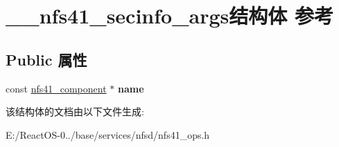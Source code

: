 \hypertarget{struct____nfs41__secinfo__args}{}\section{\+\_\+\+\_\+nfs41\+\_\+secinfo\+\_\+args结构体 参考}
\label{struct____nfs41__secinfo__args}
\subsection*{Public 属性}
\begin{DoxyCompactItemize}
\item 
\mbox{\label{struct____nfs41__secinfo__args_a1fec7e436fb04d07c8ab312b0f1d7e96}} 
const \hyperlink{struct____nfs41__component}{nfs41\+\_\+component} $\ast$ {\bfseries name}
\end{DoxyCompactItemize}


该结构体的文档由以下文件生成\+:\begin{DoxyCompactItemize}
\item 
E\+:/\+React\+O\+S-\/0../base/services/nfsd/nfs41\+\_\+ops.\+h\end{DoxyCompactItemize}
